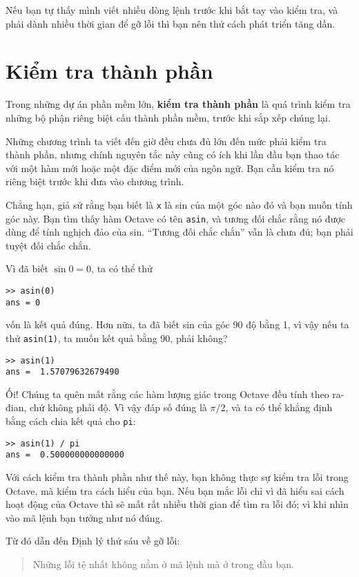 \documentclass[12pt]{book}
\begin{document}
Nếu bạn tự thấy mình viết nhiều dòng lệnh trước khi bắt tay vào 
kiểm tra, và phải dành nhiều thời gian để gỡ lỗi thì bạn nên thử
cách phát triển tăng dần.


\section{Kiểm tra thành phần}

Trong những dự án phần mềm lớn, {\bf kiểm tra thành phần} là 
quá trình kiểm tra những bộ phận riêng biệt cấu thành phần mềm,
trước khi sắp xếp chúng lại.

Những chương trình ta viết đến giờ đều chưa đủ lớn đến mức phải
kiểm tra thành phần, nhưng chính nguyên tắc này cũng có ích khi
lần đầu bạn thao tác với một hàm mới hoặc một đặc điểm mới của 
ngôn ngữ. Bạn cần kiểm tra nó riêng biệt trước khi đưa vào 
chương trình.

Chẳng hạn, giả sử rằng bạn biết là {\tt x} là sin của một góc nào đó
và bạn muốn tính góc này. Bạn tìm thấy hàm Octave có tên {\tt asin},
và tương đối chắc rằng nó được dùng để tính nghịch đảo của sin.
``Tương đối chắc chắn'' vẫn là chưa đủ; bạn phải tuyệt đối chắc
chắn.

Vì đã biết $\sin 0 = 0$, ta có thể thử

\begin{verbatim}
>> asin(0)
ans = 0
\end{verbatim}
%
\noindent vốn là kết quả đúng. Hơn nữa, ta đã biết sin của góc 90 độ 
bằng 1, vì vậy nếu ta thử {\tt asin(1)}, ta muốn kết quả bằng 90, 
phải không?

\begin{verbatim}
>> asin(1)
ans =  1.57079632679490
\end{verbatim}
%
Ối! Chúng ta quên mất rằng các hàm lượng giác trong Octave đều 
tính theo ra-đian, chứ không phải độ. Vì vậy đáp số đúng là $\pi/2$, 
và ta có thể khẳng định bằng cách chia kết quả cho {\tt pi}:

\begin{verbatim}
>> asin(1) / pi
ans =  0.500000000000000
\end{verbatim}
%
Với cách kiểm tra thành phần như thế này, bạn không thực sự kiểm tra
lỗi trong Octave, mà kiểm tra cách hiểu của bạn. Nếu bạn mắc lỗi
chỉ vì đã hiểu sai cách hoạt động của Octave thì sẽ mất rất nhiều
thời gian để tìm ra lỗi đó; vì khi nhìn vào mã lệnh bạn tưởng như
nó đúng.

Từ đó dẫn đến Định lý thứ sáu về gỡ lỗi:

\begin{quote}
Những lỗi tệ nhất không nằm ở mã lệnh mà ở trong đầu bạn.
\end{quote}
\end{document}
